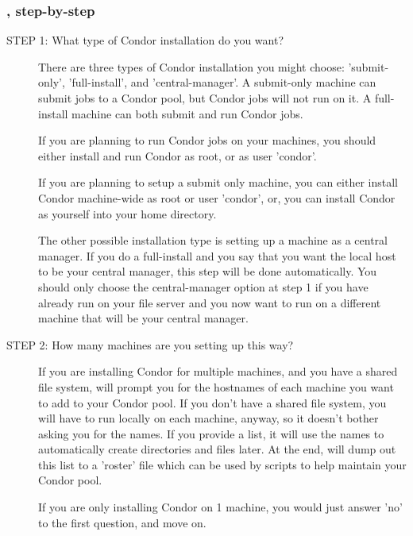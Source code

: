 \subsubsection{, step-by-step}

\begin{description}
\item[STEP 1: What type of Condor installation do you want?]

     There are three types of Condor installation you might choose:
     'submit-only', 'full-install', and 'central-manager'.  A
     submit-only machine can submit jobs to a Condor pool, but Condor
     jobs will not run on it.  A full-install machine can both submit
     and run Condor jobs.  

     If you are planning to run Condor jobs on your machines, you
     should either install and run Condor as root, or as user
     'condor'.  

     If you are planning to setup a submit only machine, you can
     either install Condor machine-wide as root or user 'condor', or,
     you can install Condor as yourself into your home directory.

     The other possible installation type is setting up a machine as a
     central manager.  If you do a full-install and you say that you
     want the local host to be your central manager, this step will be
     done automatically.  You should only choose the central-manager
     option at step 1 if you have already run  on your
     file server and you now want to run  on a different
     machine that will be your central manager.

\item[STEP 2: How many machines are you setting up this way?]

     If you are installing Condor for multiple machines, and you have
     a shared file system,  will prompt you for the
     hostnames of each machine you want to add to your Condor pool.
     If you don't have a shared file system, you will have to run
      locally on each machine, anyway, so it doesn't
     bother asking you for the names.  If you provide a list, it will
     use the names to automatically create directories and files
     later.  At the end,  will dump out this list to a
     'roster' file which can be used by scripts to help maintain your
     Condor pool.

     If you are only installing Condor on 1 machine, you would just
     answer 'no' to the first question, and move on.


\end{description}
